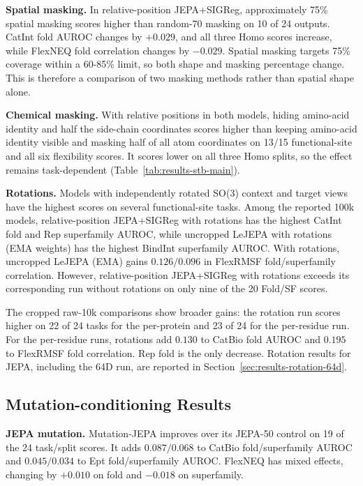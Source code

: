 \textbf{Spatial masking.}
In relative-position JEPA+SIGReg, approximately 75\% spatial masking scores higher than random-70 masking on 10 of 24 outputs.
CatInt fold AUROC changes by $+0.029$, and all three Homo scores increase, while FlexNEQ fold correlation changes by $-0.029$.
Spatial masking targets 75\% coverage within a 60-85\% limit, so both shape and masking percentage change. This is therefore a comparison of two masking methods rather than spatial shape alone.


\textbf{Chemical masking.}
With relative positions in both models, hiding amino-acid identity and half the side-chain coordinates scores higher than keeping amino-acid identity visible and masking half of all atom coordinates on 13/15 functional-site and all six flexibility scores. It scores lower on all three Homo splits, so the effect remains task-dependent (Table~\ref{tab:results-stb-main}).

\textbf{Rotations.}
Models with independently rotated SO(3) context and target views have the highest scores on several functional-site tasks.
Among the reported 100k models, relative-position JEPA+SIGReg with rotations has the highest CatInt fold and Rep superfamily AUROC, while uncropped LeJEPA with rotations (EMA weights) has the highest BindInt superfamily AUROC.
With rotations, uncropped LeJEPA (EMA) gains $0.126/0.096$ in FlexRMSF fold/superfamily correlation.
However, relative-position JEPA+SIGReg with rotations exceeds its corresponding run without rotations on only nine of the 20 Fold/SF scores.

The cropped raw-10k comparisons show broader gains: the rotation run scores higher on 22 of 24 tasks for the per-protein and 23 of 24 for the per-residue run.
For the per-residue runs, rotations add $0.130$ to CatBio fold AUROC and $0.195$ to FlexRMSF fold correlation. Rep fold is the only decrease.
Rotation results for JEPA, including the 64D run, are reported in Section~\ref{sec:results-rotation-64d}.


\subsection{Mutation-conditioning Results}
\label{sec:results-mutation}

\textbf{JEPA mutation. }
Mutation-JEPA improves over its JEPA-50 control on 19 of the 24 task/split scores.
It adds $0.087/0.068$ to CatBio fold/superfamily AUROC and $0.045/0.034$ to Ept fold/superfamily AUROC.
FlexNEQ has mixed effects, changing by $+0.010$ on fold and $-0.018$ on superfamily.

